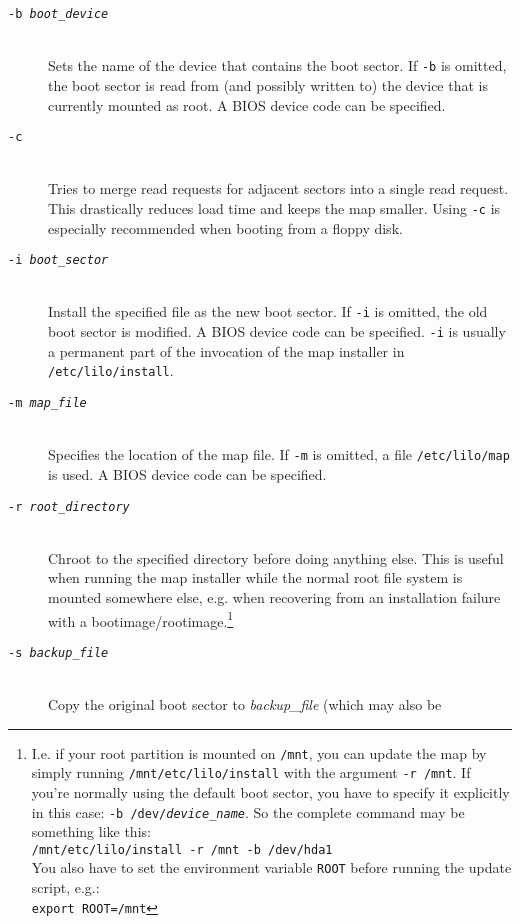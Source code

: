 \begin{description}
  \item[\tt -b \it boot\_device]~ \\
    Sets the name of the device that contains the boot sector. If {\tt -b}
    is omitted, the boot sector is read from (and possibly written to) the
    device that is currently mounted as root. A BIOS device code can be
    specified.
  \item[\tt -c]~ \\
    Tries to merge read requests for adjacent sectors into a single read
    request. This drastically reduces load time and keeps the map
    smaller. Using {\tt -c} is especially recommended when booting from
    a floppy disk.
  \item[\tt -i \it boot\_sector]~ \\
    Install the specified file as the new boot sector. If {\tt -i} is omitted,
    the old boot sector is modified. A BIOS device code can be specified.
    {\tt -i} is usually a permanent part of the invocation of the map installer
    in {\tt /etc/lilo/install}.
  \item[\tt -m \it map\_file]~ \\
    Specifies the location of the map file. If {\tt -m} is omitted, a file
    {\tt /etc/lilo/map} is used. A BIOS device code can be specified.
  \item[\tt -r \it root\_directory]~ \\
    Chroot to the specified directory before doing anything else. This is
    useful when running the map installer while the normal root file system
    is mounted somewhere else, e.g. when recovering from an installation
    failure with a bootimage/rootimage.\footnote{I.e. if your root partition
      is mounted on {\tt /mnt}, you can update the map by simply running
      {\tt /mnt/etc/lilo/install} with the argument {\tt -r /mnt}. If you're
      normally using the default boot sector, you have to specify it
      explicitly in this case: {\tt -b /dev/{\it device\_name}}. So the
      complete command may be something like this: \\
      \verb"/mnt/etc/lilo/install -r /mnt -b /dev/hda1" \\
      You also have to set the environment variable {\tt ROOT} before running
      the update script, e.g.: \\
      \verb"export ROOT=/mnt"}
  \item[\tt -s \it backup\_file]~ \\
    Copy the original boot sector to {\it backup\_file\/} (which may also be

\end{description}
